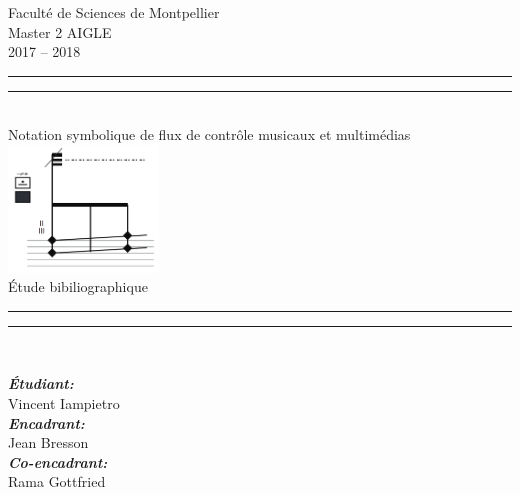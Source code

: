 \begin{titlepage}
\begin{center}
\begin{sffamily}

{\large
Faculté de Sciences de Montpellier \\[.5cm]
Master 2 AIGLE\\2017 -- 2018\\[2cm]
}


\rule{\textwidth}{1.6pt}\vspace*{-\baselineskip}\vspace*{2pt} 
\rule{\textwidth}{0.4pt}\\[\baselineskip]
{\LARGE
Notation symbolique de flux de contrôle musicaux et multimédias\\[0.7\baselineskip]
\includegraphics[width=0.3\textwidth]{Paratextes/i/logo.png}
\\[0.5\baselineskip]
Étude bibiliographique
}\\[0.2\baselineskip] 
\rule{\textwidth}{0.4pt}\vspace*{-\baselineskip}\vspace{3.2pt}
\rule{\textwidth}{1.6pt}\\[\baselineskip]
\vspace*{2\baselineskip}

\noindent
\begin{center}
     \large
    \emph{\textbf{Étudiant:}}\\
    Vincent Iampietro \\
    \smallskip
    \large
    \emph{\textbf{Encadrant:}}\\
    Jean Bresson\\
    \emph{\textbf{Co-encadrant:}}\\
    Rama Gottfried
\end{center}%



\end{sffamily}
\end{center}
\end{titlepage}